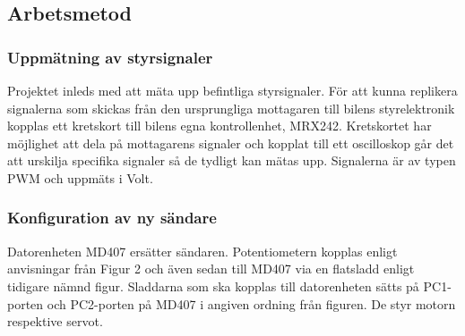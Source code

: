 \documentclass[a4paper]{article}
\begin{document}

\subsection{Arbetsmetod}
\subsubsection{Uppmätning av styrsignaler}
Projektet inleds med att mäta upp befintliga styrsignaler. För att kunna replikera signalerna som skickas från den ursprungliga mottagaren till bilens styrelektronik kopplas ett kretskort till bilens egna kontrollenhet, MRX242. Kretskortet har möjlighet att dela på mottagarens signaler och kopplat till ett oscilloskop går det att urskilja specifika signaler så de tydligt kan mätas upp. Signalerna är av typen PWM och uppmäts i Volt. 


\subsubsection{Konfiguration av ny sändare}
\vspace{5mm} \noindent
Datorenheten MD407 ersätter sändaren. Potentiometern kopplas enligt anvisningar från Figur 2 och även sedan till MD407 via en flatsladd enligt tidigare nämnd figur. Sladdarna som ska kopplas till datorenheten sätts på PC1-porten och PC2-porten på MD407 i angiven ordning från figuren. De styr motorn respektive servot. 

\end{document}
